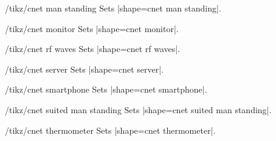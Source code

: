 \documentclass[a4paper]{ltxdoc}
\begin{document}
\begin{stylekey}{/tikz/cnet man standing}
Sets |shape={cnet man standing}|.
\begin{codeexample}[preamble={\usetikzlibrary{shapes.cnet.manstanding}}]
\end{codeexample}
\end{stylekey}

\begin{stylekey}{/tikz/cnet monitor}
Sets |shape={cnet monitor}|.
\begin{codeexample}[preamble={\usetikzlibrary{shapes.cnet.monitor}}]
\end{codeexample}
\end{stylekey}

\begin{stylekey}{/tikz/cnet rf waves}
Sets |shape={cnet rf waves}|.
\begin{codeexample}[preamble={\usetikzlibrary{shapes.cnet.rfwaves}}]
\end{codeexample}
\end{stylekey}

\begin{stylekey}{/tikz/cnet server}
Sets |shape={cnet server}|.
\begin{codeexample}[preamble={\usetikzlibrary{shapes.cnet.server}}]
\end{codeexample}
\end{stylekey}

\begin{stylekey}{/tikz/cnet smartphone}
Sets |shape={cnet smartphone}|.
\begin{codeexample}[preamble={\usetikzlibrary{shapes.cnet.smartphone}}]
\end{codeexample}
\end{stylekey}

\begin{stylekey}{/tikz/cnet suited man standing}
Sets |shape={cnet suited man standing}|.
\begin{codeexample}[preamble={\usetikzlibrary{shapes.cnet.suitedmanstanding}}]
\end{codeexample}
\end{stylekey}

\begin{stylekey}{/tikz/cnet thermometer}
Sets |shape={cnet thermometer}|.
\begin{codeexample}[preamble={\usetikzlibrary{shapes.cnet.thermometer}}]
\end{codeexample}
\end{stylekey}
\end{document}
